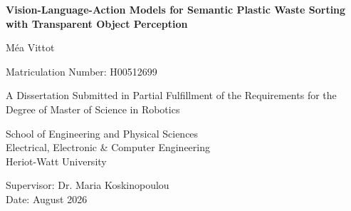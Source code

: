 \begin{titlepage}
    \begin{center}
        \vspace*{1cm}
        
        \Huge
        \textbf{Vision-Language-Action Models for Semantic Plastic Waste Sorting with Transparent Object Perception}
        
        \vspace{1.5cm}
        \Large
        Méa Vittot
        
        \vspace{0.5cm}
        \large
        Matriculation Number: H00512699
        
        \vspace{2cm}
        \linespread{1.2}\selectfont
        A Dissertation Submitted in Partial Fulfillment of the Requirements for the Degree of Master of Science in Robotics
        
        \vspace{2cm}
        \graphicspath{{images/}}
        
        \vspace{2cm}
        \Large
        School of Engineering and Physical Sciences\\
        Electrical, Electronic \& Computer Engineering\\
        Heriot-Watt University
        
        \vspace{1.5cm}
        \large
        Supervisor: Dr. Maria Koskinopoulou\\
        Date: August 2026
        
    \end{center}
\end{titlepage}